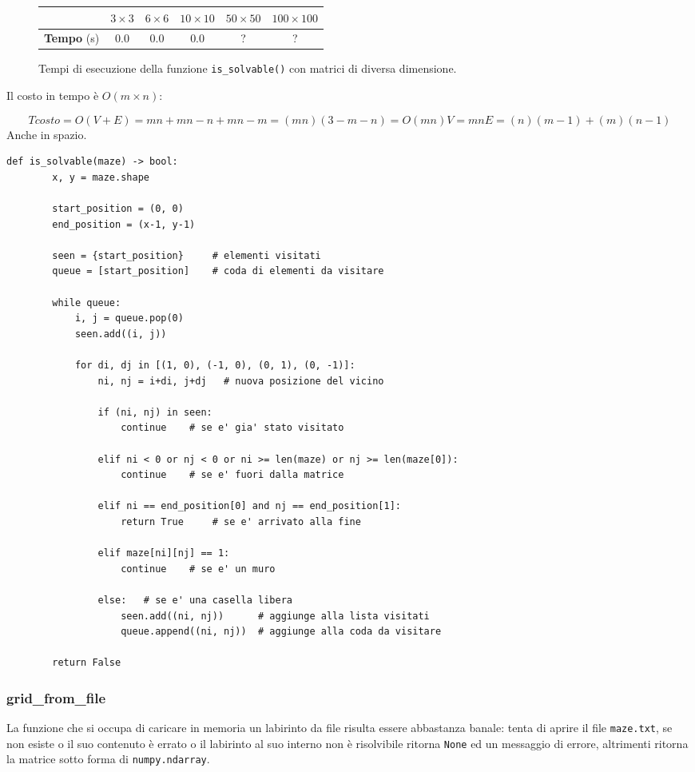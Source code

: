 \begin{figure}[H]
	\centering
   	\begin{tabular}{c | c | c | c | c | c}
		 & $3 \times 3$ & $6 \times 6$ & $10 \times 10$ & $50 \times 50$ & $100 \times 100$\\
		\hline
		\textbf{Tempo} (s) & 0.0 & 0.0 & 0.0 & ? & ?\\ [2em]
	\end{tabular}
	\caption{Tempi di esecuzione della funzione \lstinline[style=cmd]|is_solvable()| con matrici di diversa dimensione.}
\end{figure}

Il costo in tempo \`{e} $O(m \times n)$:

\[
	Tcosto = O(V + E) = mn + mn - n + mn - m = (mn)(3 - m - n) = O(mn)
	
	V = mn
	E = (n)(m-1) + (m)(n-1)
\]
Anche in spazio.

\begin{lstlisting}[style=python, caption={Funzione per controllare la risolvibilit\`{a} dei labirinti}]
	def is_solvable(maze) -> bool:
		x, y = maze.shape
		
		start_position = (0, 0)
		end_position = (x-1, y-1)

		seen = {start_position}     # elementi visitati
		queue = [start_position]    # coda di elementi da visitare
	
		while queue:
			i, j = queue.pop(0)
			seen.add((i, j))
	
			for di, dj in [(1, 0), (-1, 0), (0, 1), (0, -1)]:
				ni, nj = i+di, j+dj   # nuova posizione del vicino
				
				if (ni, nj) in seen:
					continue	# se e' gia' stato visitato
	
				elif ni < 0 or nj < 0 or ni >= len(maze) or nj >= len(maze[0]):
					continue	# se e' fuori dalla matrice
	
				elif ni == end_position[0] and nj == end_position[1]:
					return True		# se e' arrivato alla fine
	
				elif maze[ni][nj] == 1:
					continue	# se e' un muro
	
				else: 	# se e' una casella libera
					seen.add((ni, nj))      # aggiunge alla lista visitati
					queue.append((ni, nj))  # aggiunge alla coda da visitare
	
		return False
\end{lstlisting}

\subsubsection{grid\_from\_file}
La funzione che si occupa di caricare in memoria un labirinto da file risulta essere abbastanza banale: tenta di aprire il file \lstinline[style=cmd]|maze.txt|, se non esiste o il suo contenuto \`{e} errato o il labirinto al suo interno non \`{e} risolvibile ritorna \lstinline[style=cmd]|None| ed un messaggio di errore, altrimenti ritorna la matrice sotto forma di \lstinline[style=cmd]|numpy.ndarray|.

